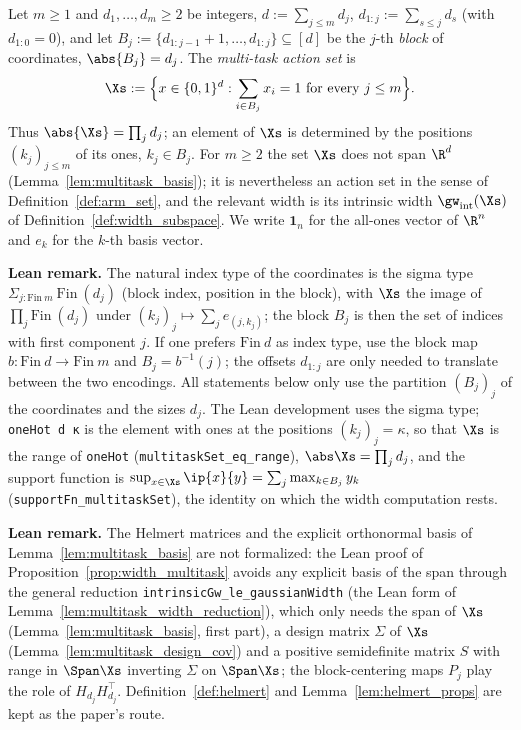 \begin{definition}\label{def:multitask_set}
\leanok
{}
Let $m \ge 1$ and $d_1,\dots,d_m \ge 2$ be integers, $d := \sum_{j\le m} d_j$,
$d_{1:j} := \sum_{s\le j}d_s$ (with $d_{1:0} = 0$), and let
$B_j := \{d_{1:j-1}+1, \dots, d_{1:j}\} \subseteq [d]$ be the $j$-th \emph{block} of
coordinates, $\abs{B_j} = d_j$. The \emph{multi-task action set} is
\[
  \Xs := \Big\{x \in \{0,1\}^d : \sum_{i\in B_j}x_i = 1 \text{ for every } j \le m\Big\}.
\]
Thus $\abs{\Xs} = \prod_j d_j$; an element of $\Xs$ is determined by the positions
$(k_j)_{j\le m}$ of its ones, $k_j \in B_j$. For $m \ge 2$ the set $\Xs$ does not span $\R^d$
(Lemma~\ref{lem:multitask_basis}); it is nevertheless an action set in the sense of
Definition~\ref{def:arm_set}, and the relevant width is its intrinsic width
$\gw_{\mathrm{int}}(\Xs)$ of Definition~\ref{def:width_subspace}.
We write $\mathbf 1_n$ for the all-ones vector of $\R^n$ and $e_k$ for the $k$-th basis vector.
\end{definition}

\textbf{Lean remark.} The natural index type of the coordinates is the sigma type
$\Sigma_{j : \mathrm{Fin}\ m}\ \mathrm{Fin}\ (d_j)$ (block index, position in the block), with
$\Xs$ the image of $\prod_{j}\mathrm{Fin}\ (d_j)$ under
$(k_j)_j \mapsto \sum_j e_{(j,k_j)}$; the block $B_j$ is then the set of indices with first
component $j$. If one prefers $\mathrm{Fin}\ d$ as index type, use the block map
$b : \mathrm{Fin}\ d \to \mathrm{Fin}\ m$ and $B_j = b^{-1}(j)$; the offsets $d_{1:j}$ are
only needed to translate between the two encodings. All statements below only use the
partition $(B_j)_j$ of the coordinates and the sizes $d_j$. The Lean development uses the sigma
type; \texttt{oneHot d κ} is the element with ones at the positions $(k_j)_j = \kappa$, so that
$\Xs$ is the range of \texttt{oneHot} (\texttt{multitaskSet\_eq\_range}), $\abs\Xs = \prod_j d_j$,
and the support function is $\sup_{x\in\Xs}\ip{x}{y} = \sum_j\max_{k\in B_j}y_k$
(\texttt{supportFn\_multitaskSet}), the identity on which the width computation rests.

\textbf{Lean remark.} The Helmert matrices and the explicit orthonormal basis of
Lemma~\ref{lem:multitask_basis} are not formalized: the Lean proof of
Proposition~\ref{prop:width_multitask} avoids any explicit basis of the span through the
general reduction \texttt{intrinsicGw\_le\_gaussianWidth} (the Lean form of
Lemma~\ref{lem:multitask_width_reduction}), which only needs the span of $\Xs$
(Lemma~\ref{lem:multitask_basis}, first part), a design matrix $\Sigma$ of $\Xs$
(Lemma~\ref{lem:multitask_design_cov}) and a positive semidefinite matrix $S$ with range in
$\Span\Xs$ inverting $\Sigma$ on $\Span\Xs$; the block-centering maps $P_j$ play the role
of $H_{d_j}H_{d_j}^\top$. Definition~\ref{def:helmert} and Lemma~\ref{lem:helmert_props} are
kept as the paper's route.


